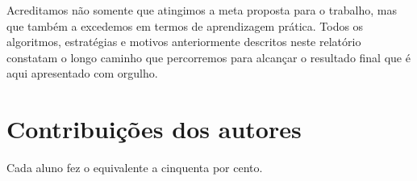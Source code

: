 \documentclass{report}
\begin{document}
Acreditamos não somente que atingimos a meta proposta para o trabalho, mas que também a excedemos em termos de aprendizagem prática. Todos os algoritmos, estratégias e motivos anteriormente descritos neste relatório constatam o longo caminho que percorremos
para alcançar o resultado final que é aqui apresentado com orgulho.
\chapter*{Contribuições dos autores}
Cada aluno fez o equivalente a cinquenta por cento.
\end{document}
